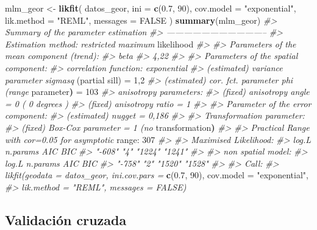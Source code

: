\documentclass[11pt,b5paper,]{krantz}
\newenvironment{Shaded}{}{}
\newcommand{\CommentTok}[1]{\textcolor[rgb]{0.38,0.63,0.69}{\textit{#1}}}
\newcommand{\DataTypeTok}[1]{\textcolor[rgb]{0.56,0.13,0.00}{#1}}
\newcommand{\DecValTok}[1]{\textcolor[rgb]{0.25,0.63,0.44}{#1}}
\newcommand{\ErrorTok}[1]{\textcolor[rgb]{1.00,0.00,0.00}{\textbf{#1}}}
\newcommand{\FloatTok}[1]{\textcolor[rgb]{0.25,0.63,0.44}{#1}}
\newcommand{\KeywordTok}[1]{\textcolor[rgb]{0.00,0.44,0.13}{\textbf{#1}}}
\newcommand{\NormalTok}[1]{#1}
\newcommand{\OperatorTok}[1]{\textcolor[rgb]{0.40,0.40,0.40}{#1}}
\newcommand{\OtherTok}[1]{\textcolor[rgb]{0.00,0.44,0.13}{#1}}
\newcommand{\StringTok}[1]{\textcolor[rgb]{0.25,0.44,0.63}{#1}}
\begin{document}
\begin{Shaded}
\begin{Highlighting}[]
\NormalTok{mlm_geor <-}
\StringTok{  }\KeywordTok{likfit}\NormalTok{(}
\NormalTok{    datos_geor,}
    \DataTypeTok{ini =} \KeywordTok{c}\NormalTok{(}\FloatTok{0.7}\NormalTok{, }\DecValTok{90}\NormalTok{),}
    \DataTypeTok{cov.model =} \StringTok{"exponential"}\NormalTok{,}
    \DataTypeTok{lik.method =} \StringTok{"REML"}\NormalTok{,}
    \DataTypeTok{messages =} \OtherTok{FALSE}
\NormalTok{  )}
\KeywordTok{summary}\NormalTok{(mlm_geor)}
\CommentTok{#> Summary of the parameter estimation}
\CommentTok{#> -----------------------------------}
\CommentTok{#> Estimation method: restricted maximum}
\NormalTok{likelihood}
\CommentTok{#>}
\CommentTok{#> Parameters of the mean component (trend):}
\CommentTok{#> beta}
\CommentTok{#> 4,22}
\CommentTok{#>}
\CommentTok{#> Parameters of the spatial component:}
\CommentTok{#> correlation function: exponential}
\CommentTok{#> (estimated) variance parameter sigmasq}
\NormalTok{(partial sill) =}\StringTok{ }\DecValTok{1}\NormalTok{,}\DecValTok{2}
\CommentTok{#> (estimated) cor. fct. parameter phi (range}
\NormalTok{parameter}\ErrorTok{)}\NormalTok{ =}\StringTok{ }\DecValTok{103}
\CommentTok{#> anisotropy parameters:}
\CommentTok{#> (fixed) anisotropy angle = 0 ( 0 degrees )}
\CommentTok{#> (fixed) anisotropy ratio = 1}
\CommentTok{#>}
\CommentTok{#> Parameter of the error component:}
\CommentTok{#> (estimated) nugget = 0,186}
\CommentTok{#>}
\CommentTok{#> Transformation parameter:}
\CommentTok{#> (fixed) Box-Cox parameter = 1 (no}
\NormalTok{transformation}\ErrorTok{)}
\CommentTok{#>}
\CommentTok{#> Practical Range with cor=0.05 for asymptotic}
\NormalTok{range}\OperatorTok{:}\StringTok{ }\DecValTok{307}
\CommentTok{#>}
\CommentTok{#> Maximised Likelihood:}
\CommentTok{#> log.L n.params AIC BIC}
\CommentTok{#> "-608" "4" "1224" "1241"}
\CommentTok{#>}
\CommentTok{#> non spatial model:}
\CommentTok{#> log.L n.params AIC BIC}
\CommentTok{#> "-758" "2" "1520" "1528"}
\CommentTok{#>}
\CommentTok{#> Call:}
\CommentTok{#> likfit(geodata = datos_geor, ini.cov.pars =}
\KeywordTok{c}\NormalTok{(}\FloatTok{0.7}\NormalTok{, }\DecValTok{90}\NormalTok{), cov.model =}\StringTok{ "exponential"}\NormalTok{,}
\CommentTok{#> lik.method = "REML", messages = FALSE)}
\end{Highlighting}
\end{Shaded}

\hypertarget{validaciuxf3n-cruzada-1}{%
\subsection{Validación cruzada}\label{validaciuxf3n-cruzada-1}}
\end{document}

